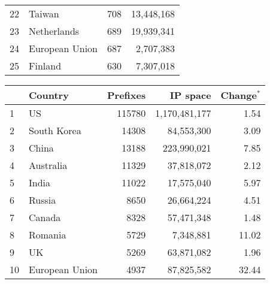 \begin{table*}[tp]
\begin{minipage}[t]{0.48\textwidth}
\begin{center}
\begin{tabular}{|l||l|r|r|}
22      &       Taiwan  		&       708     &       13,448,168      \tabularnewline %
23      &       Netherlands     &       689     &       19,939,341      \tabularnewline %
24      &       European Union  &       687     &       2,707,383       \tabularnewline %
25      &       Finland 		&       630     &       7,307,018       \tabularnewline %
	\hline
	\end{tabular}
	\end{center}
\end{minipage}
%
\quad
%
\begin{minipage}[t]{0.48\textwidth}
	\begin{center}
	\caption{Top 25 countries with the most number of announced prefixes in BGP table on \textbf{April 23, 2009}}
	\label{tab:top25 bgp prefixes 2009}
	\begin{tabular}{|l||l|r|r|r|}
		\hline
		&      \bf Country		& \bf Prefixes  &       \bf IP space 	& \bf Change$^{*}$ 	\tabularnewline \hline 
1       &       US      		&       115780  &       1,170,481,177   & 1.54			\tabularnewline %
2       &       South Korea     &       14308   &       84,553,300      & 3.09			\tabularnewline %
3       &       China  			&       13188   &       223,990,021     & 7.85			\tabularnewline %
4       &       Australia       &       11329   &       37,818,072      & 2.12			\tabularnewline %
5       &       India   		&       11022   &       17,575,040      & 5.97			\tabularnewline %
6       &       Russia  		&       8650    &       26,664,224      & 4.51			\tabularnewline %
7       &       Canada  		&       8328    &       57,471,348      & 1.48			\tabularnewline %
8       &       Romania 		&       5729    &       7,348,881       & 11.02			\tabularnewline %
9       &       UK      		&       5269    &       63,871,082      & 1.96			\tabularnewline %
10      &       European Union  &       4937    &       87,825,582      & 32.44			\tabularnewline %

\end{tabular}
\end{center}
\end{minipage}
\end{table*}
